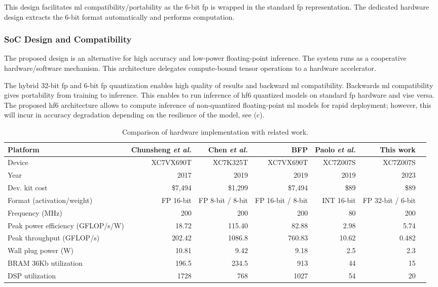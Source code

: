 This design facilitates \gls{ml} compatibility/portability as the 6-bit \gls{fp} is wrapped in the standard \gls{fp} representation. The dedicated hardware design extracts the 6-bit format automatically and performs computation.

\subsubsection{SoC Design and Compatibility}
The proposed design is an alternative for high accuracy and low-power floating-point inference. The system runs as a cooperative hardware/software mechanism. This architecture delegates compute-bound tensor operations to a hardware accelerator.

The hybrid 32-bit \gls{fp} and 6-bit \gls{fp} quantization enables high quality of results and backward \gls{ml} compatibility. Backwards \gls{ml} compatibility gives portability from training to inference. This enables to run inference of \gls{hf6} quantized models on standard \gls{fp} hardware and vise versa. The proposed \gls{hf6} architecture allows to compute inference of non-quantized floating-point \gls{ml} models for rapid deployment; however, this will incur in accuracy degradation depending on the resilience of the model, see (c).

\begin{table}[!t]\centering
	\caption{Comparison of hardware implementation with related work.}\label{tab:comparison}
	\scriptsize
	\begin{tabular}{lrrrrrr}\toprule
		Platform &Chunsheng \textit{et al.} \cite{mei2017200mhz} &Chen \textit{et al.} \cite{wu2021low} &BFP \cite{lian2019high} &Paolo \textit{et al.} \cite{meloni2019cnn} &This work \\\midrule
		Device &XC7VX690T &XC7K325T &XC7VX690T &XC7Z007S &XC7Z007S \\
		Year &2017 &2019 &2019 &2019 &2023 \\
		Dev. kit cost &\$7,494 &\$1,299 &\$7,494 &\$89 &\$89 \\
		Format (activation/weight) &FP 16-bit &FP 8-bit / 8-bit &FP 16-bit / 8-bit &INT 16-bit &FP 32-bit / 6-bit \\
		Frequency (MHz) &200 &200 &200 &80 &200 \\
		Peak power efficiency (GFLOP/s/W) &18.72 &115.40 &82.88 &2.98 &5.74 \\
		Peak throughput (GFLOP/s) & 202.42 & 1086.8 & 760.83 &  10.62& 0.482\\
		Wall plug power (W) &10.81 &9.42 &9.18 &2.5 &2.3 \\
		BRAM 36Kb utilization &196.5 &234.5 &913 &44 &15 \\
		DSP utilization &1728 &768 &1027 &54 &20 \\
		\bottomrule
	\end{tabular}
\end{table}